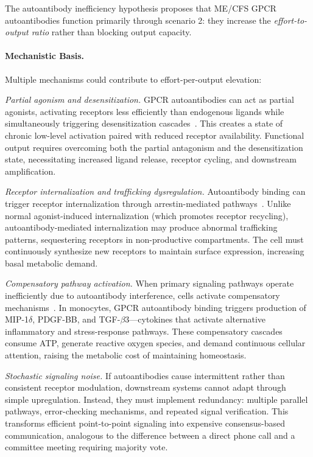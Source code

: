 \begin{speculation}
The autoantibody inefficiency hypothesis proposes that ME/CFS GPCR autoantibodies function primarily through scenario 2: they increase the \textit{effort-to-output ratio} rather than blocking output capacity.

\paragraph{Mechanistic Basis.}

Multiple mechanisms could contribute to effort-per-output elevation:

\textit{Partial agonism and desensitization.} GPCR autoantibodies can act as partial agonists, activating receptors less efficiently than endogenous ligands while simultaneously triggering desensitization cascades~\cite{Wallukat2021gpcr_mechanisms}. This creates a state of chronic low-level activation paired with reduced receptor availability. Functional output requires overcoming both the partial antagonism and the desensitization state, necessitating increased ligand release, receptor cycling, and downstream amplification.

\textit{Receptor internalization and trafficking dysregulation.} Autoantibody binding can trigger receptor internalization through arrestin-mediated pathways~\cite{Kim2026nmdar_cryoem}. Unlike normal agonist-induced internalization (which promotes receptor recycling), autoantibody-mediated internalization may produce abnormal trafficking patterns, sequestering receptors in non-productive compartments. The cell must continuously synthesize new receptors to maintain surface expression, increasing basal metabolic demand.

\textit{Compensatory pathway activation.} When primary signaling pathways operate inefficiently due to autoantibody interference, cells activate compensatory mechanisms~\cite{Hackel2025monocyte}. In monocytes, GPCR autoantibody binding triggers production of MIP-1$\delta$, PDGF-BB, and TGF-$\beta$3---cytokines that activate alternative inflammatory and stress-response pathways. These compensatory cascades consume ATP, generate reactive oxygen species, and demand continuous cellular attention, raising the metabolic cost of maintaining homeostasis.

\textit{Stochastic signaling noise.} If autoantibodies cause intermittent rather than consistent receptor modulation, downstream systems cannot adapt through simple upregulation. Instead, they must implement redundancy: multiple parallel pathways, error-checking mechanisms, and repeated signal verification. This transforms efficient point-to-point signaling into expensive consensus-based communication, analogous to the difference between a direct phone call and a committee meeting requiring majority vote.


\end{speculation}
